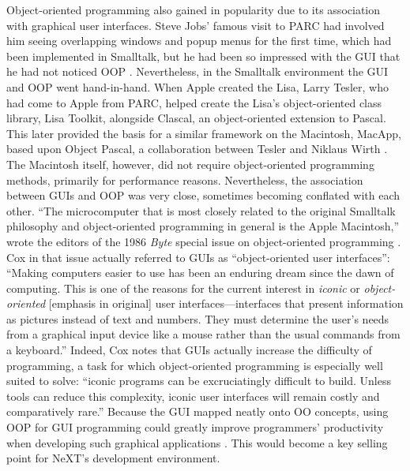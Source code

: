 \documentclass[acmsmall,screen]{acmart}
\begin{document}
Object-oriented programming also gained in popularity due to its association with graphical user interfaces. Steve Jobs' famous visit to PARC had involved him seeing overlapping windows and popup menus for the first time, which had been implemented in Smalltalk, but he had been so impressed with the GUI that he had not noticed OOP \citetext{\citealp[330]{hiltzik_dealers_1999};  }. Nevertheless, in the Smalltalk environment the GUI and OOP went hand-in-hand. When Apple created the Lisa, Larry Tesler, who had come to Apple from PARC, helped create the Lisa's object-oriented class library, Lisa Toolkit, alongside Clascal, an object-oriented extension to Pascal. This later provided the basis for a similar framework on the Macintosh, MacApp, based upon Object Pascal, a collaboration between Tesler and Niklaus Wirth \citetext{\citealp{schmucker_object-oriented_1986,schmucker_macapp:_1986}, \citealp[42--45]{tesler_oral_2016}}. The Macintosh itself, however, did not require object-oriented programming methods, primarily for performance reasons. Nevertheless, the association between GUIs and OOP was very close, sometimes becoming conflated with each other. ``The microcomputer that is most closely related to the original Smalltalk philosophy and object-oriented programming in general is the Apple Macintosh,'' wrote the editors of the 1986 \emph{Byte} special issue on object-oriented programming \citep[137]{white_object-oriented_1986}. Cox in that issue actually referred to GUIs as ``object-oriented user interfaces'': ``Making computers easier to use has been an enduring dream since the dawn of computing. This is one of the reasons for the current interest in \emph{iconic} or \emph{object-oriented} [emphasis in original] user interfaces---interfaces that present information as pictures instead of text and numbers.\textellipsis{} They must determine the user's needs from a graphical input device like a mouse rather than the usual commands from a keyboard.'' Indeed, Cox notes that GUIs actually increase the difficulty of programming, a task for which object-oriented programming is especially well suited to solve: ``\textellipsis{}iconic programs can be excruciatingly difficult to build.\textellipsis{} Unless tools can reduce this complexity, iconic user interfaces will remain costly and comparatively rare.'' \citep[161]{cox_objects_1986} Because the GUI mapped neatly onto OO concepts, using OOP for GUI programming could greatly improve programmers' productivity when developing such graphical applications \citep{schmucker_object-oriented_1986,schmucker_macapp:_1986,tesler_programming_1986}. This would become a key selling point for NeXT's development environment.
\end{document}

